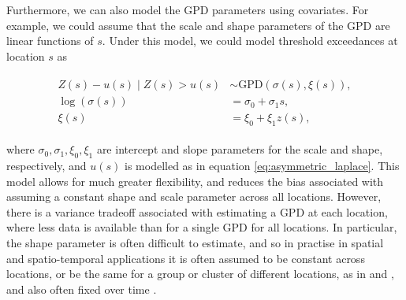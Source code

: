 \documentclass{article}
\numberwithin{equation}{section}
\begin{document}
Furthermore, we can also model the GPD parameters using covariates.
For example, we could assume that the scale and shape parameters of the GPD are linear functions of $s$.
Under this model, we could model threshold exceedances at location $s$ as 
\begin{center}
  \begin{align} \label{eq:non_stationary_gpd}
    \begin{split}
      Z(s) - u(s) \mid Z(s) > u(s) &\sim \text{GPD}(\sigma(s), \xi(s)), \\
                   \log(\sigma(s)) &= \sigma_0 + \sigma_1 s, \\
                            \xi(s) &= \xi_0 + \xi_1 z(s),
    \end{split}
  \end{align}
\end{center}
where $\sigma_0, \sigma_1, \xi_0, \xi_1$ are intercept and slope parameters for the scale and shape, respectively, and $u(s)$ is modelled as in equation \eqref{eq:asymmetric_laplace}.
This model allows for much greater flexibility, and reduces the bias associated with assuming a constant shape and scale parameter across all locations.
However, there is a variance tradeoff associated with estimating a GPD at each location, where less data is available than for a single GPD for all locations.
In particular, the shape parameter is often difficult to estimate, and so in practise in spatial and spatio-temporal applications it is often assumed to be constant across locations, or be the same for a group or cluster of different locations, as in \citet{Cooley2007} and \citet{Rohrbeck2021}, and also often fixed over time \citep{Risser2019, Zhang2024}. 
\end{document}
